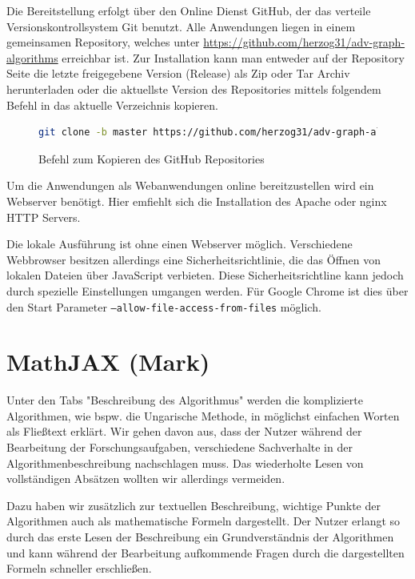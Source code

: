 Die Bereitstellung erfolgt über den Online Dienst GitHub, der das verteile Versionskontrollsystem Git benutzt. 
Alle Anwendungen liegen in einem gemeinsamen Repository, welches unter \url{https://github.com/herzog31/adv-graph-algorithms} erreichbar ist. Zur Installation kann man entweder auf der Repository Seite die letzte freigegebene Version (Release) als Zip oder Tar Archiv herunterladen oder die aktuellste Version des Repositories mittels folgendem Befehl in das aktuelle Verzeichnis kopieren.

\begin{figure}[h!]
\begin{lstlisting}[language=Bash]
git clone -b master https://github.com/herzog31/adv-graph-algorithms.git
\end{lstlisting}
\caption[Repository Kopieren]{Befehl zum Kopieren des GitHub Repositories}\label{fig:listing-github}
\end{figure}

Um die Anwendungen als Webanwendungen online bereitzustellen wird ein Webserver benötigt. Hier emfiehlt sich die Installation des Apache oder nginx  HTTP Servers.

Die lokale Ausführung ist ohne einen Webserver möglich. Verschiedene Webbrowser besitzen allerdings eine Sicherheitsrichtlinie, die das Öffnen von lokalen Dateien über JavaScript verbieten. Diese Sicherheitsrichtline kann jedoch durch spezielle Einstellungen umgangen werden. Für Google Chrome ist dies über den Start Parameter \texttt{--allow-file-access-from-files} möglich.

\section{MathJAX (Mark)}
Unter den Tabs "Beschreibung des Algorithmus" werden die komplizierte Algorithmen, wie bspw. die Ungarische Methode, in möglichst einfachen Worten als Fließtext erklärt. Wir gehen davon aus, dass der Nutzer während der Bearbeitung der Forschungsaufgaben, verschiedene Sachverhalte in der Algorithmenbeschreibung nachschlagen muss. Das wiederholte Lesen von vollständigen Absätzen wollten wir allerdings vermeiden.

Dazu haben wir zusätzlich zur textuellen Beschreibung, wichtige Punkte der Algorithmen auch als mathematische Formeln dargestellt. Der Nutzer erlangt so durch das erste Lesen der Beschreibung ein Grundverständnis der Algorithmen und kann während der Bearbeitung aufkommende Fragen durch die dargestellten Formeln schneller erschließen.


